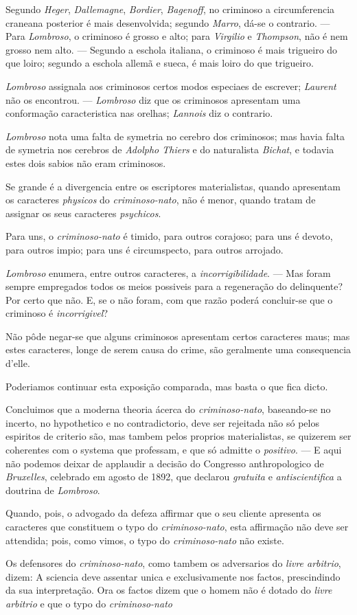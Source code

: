 Segundo \emph{Heger}, \emph{Dallemagne}, \emph{Bordier}, \emph{Bagenoff}, no criminoso a circumferencia craneana posterior é mais desenvolvida; segundo \emph{Marro}, dá-se o contrario. --- Para \emph{Lombroso}, o criminoso é grosso e alto; para \emph{Virgilio} e \emph{Thompson}, não é nem grosso nem alto. --- Segundo a eschola italiana, o criminoso é mais trigueiro do que loiro; segundo a eschola allemã e sueca, é mais loiro do que trigueiro.\par \emph{Lombroso} assignala aos criminosos certos modos especiaes de escrever; \emph{Laurent} não os encontrou. --- \emph{Lombroso} diz que os criminosos apresentam uma conformação caracteristica nas orelhas; \emph{Lannois} diz o contrario.\par \emph{Lombroso} nota uma falta de symetria no cerebro dos criminosos; mas havia falta de symetria nos cerebros de \emph{Adolpho Thiers} e do naturalista \emph{Bichat}, e todavia estes dois sabios não eram criminosos.\par Se grande é a divergencia entre os escriptores materialistas, quando apresentam os caracteres \emph{physicos} do \emph{criminoso-nato}, não é menor, quando tratam de assignar os seus caracteres \emph{psychicos}.\par Para uns, o \emph{criminoso-nato} é timido, para outros corajoso; para uns é devoto, para outros impio; para uns é circumspecto, para outros arrojado.\par \emph{Lombroso} enumera, entre outros caracteres, a \emph{incorrigibilidade}. --- Mas foram sempre empregados todos os meios possiveis para a regeneração do delinquente? Por certo que não. E, se o não foram, com que razão poderá concluir-se que o criminoso é \emph{incorrigivel}?\par Não pôde negar-se que alguns criminosos apresentam certos caracteres maus; mas estes caracteres, longe de serem causa do crime, são geralmente uma consequencia d'elle.\par Poderiamos continuar esta exposição comparada, mas basta o que fica dicto.\par Concluimos que a moderna theoria ácerca do \emph{criminoso-nato}, baseando-se no incerto, no hypothetico e no contradictorio, deve ser rejeitada não só pelos espiritos de criterio são, mas tambem pelos proprios materialistas, se quizerem ser coherentes com o systema que professam, e que só admitte o \emph{positivo}. --- E aqui não podemos deixar de applaudir a decisão do Congresso anthropologico de \emph{Bruxelles}, celebrado em agosto de 1892, que declarou \emph{gratuita} e \emph{antiscientifica} a doutrina de \emph{Lombroso}.\par Quando, pois, o advogado da defeza affirmar que o seu cliente apresenta os caracteres que constituem o typo do \emph{criminoso-nato}, esta affirmação não deve ser attendida; pois, como vimos, o typo do \emph{criminoso-nato} não existe.\par Os defensores do \emph{criminoso-nato}, como tambem os adversarios do \emph{livre arbitrio}, dizem: A sciencia deve assentar unica e exclusivamente nos factos, prescindindo da sua interpretação. Ora os factos dizem que o homem não é dotado do \emph{livre arbitrio} e que o typo do \emph{criminoso-nato} 